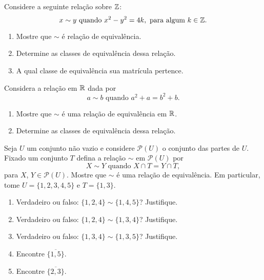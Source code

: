 \documentclass[12pt]{exam}
\begin{document}
    \vspace{.3cm}

    \questao{} Considere a seguinte relação sobre $\mathbb{Z}$:
    \[
        x \sim y \mbox{ quando }  x^2 - y^2 = 4k, \mbox{ para algum } k \in \mathbb{Z}.
    \]

    \begin{enumerate}[label={\alph*})]
        \item Mostre que $\sim$ é relação de equivalência.

        \item Determine as classes de equivalência dessa relação.

        \item A qual classe de equivalência sua matrícula pertence.
    \end{enumerate}

    \vspace{.3cm}

    \questao{} Considera a relação em $\mathbb{R}$ dada por
    \[
        a \sim b \mbox{ quando } a^2 + a = b^2 + b.
    \]
    \begin{enumerate}[label={\alph*})]
        \item Mostre que $\sim$ é uma relação de equivalência em $\mathbb{R}$.

        \item Determine as classes de equivalência dessa relação.
    \end{enumerate}

    \vspace{.3cm}

    \questao{} Seja $U$ um conjunto não vazio e considere $\mathcal{P}(U)$ o conjunto das partes de $U$. Fixado um conjunto $T$ defina a relação $\sim$ em $\mathcal{P}(U)$ por
    \[
        X \sim Y \mbox{ quando } X \cap T = Y \cap T,
    \]
    para $X$, $Y \in \mathcal{P}(U)$. Mostre que $\sim$ é uma relação de equivalência. Em particular, tome $U = \{1,2,3,4,5\}$ e $T = \{1,3\}$.
    \begin{enumerate}[label={\alph*})]
        \item Verdadeiro ou falso: $\{1,2,4\} \sim \{1,4,5\}$? Justifique.

        \item Verdadeiro ou falso: $\{1,2,4\} \sim \{1,3,4\}$? Justifique.

        \item Verdadeiro ou falso: $\{1,3,4\} \sim \{1,3,5\}$? Justifique.

        \item Encontre $\overline{\{1,5\}}$.

        \item Encontre $\overline{\{2,3\}}$.

    \end{enumerate}
\end{document}
